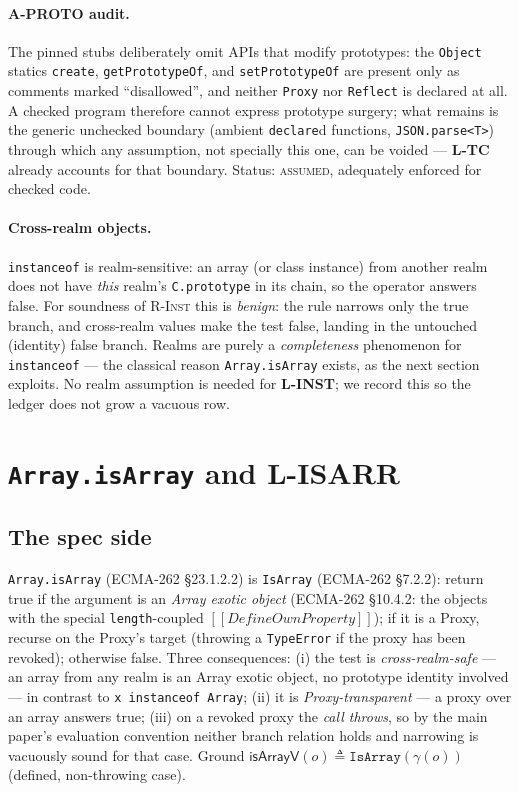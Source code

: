 \documentclass[11pt]{article}
\newcommand{\realize}{\gamma}
\newcommand{\ecma}[1]{ECMA-262 \S#1}
\newcommand{\intm}[1]{[[#1]]}
\begin{document}
\paragraph{\textbf{A-PROTO} audit.}
The pinned stubs deliberately omit APIs that modify prototypes: the
\texttt{Object} statics \texttt{create}, \texttt{getPrototypeOf}, and
\texttt{setPrototypeOf} are present only as comments marked
``disallowed'', and neither \texttt{Proxy} nor \texttt{Reflect} is
declared at all. A checked program therefore cannot express prototype
surgery; what remains is the generic unchecked boundary (ambient
\texttt{declare}d functions, \texttt{JSON.parse<T>}) through which any
assumption, not specially this one, can be voided — \textbf{L-TC} already
accounts for that boundary. Status: \textsc{assumed}, adequately
enforced for checked code.

\paragraph{Cross-realm objects.}
\texttt{instanceof} is realm-sensitive: an array (or class instance)
from another realm does not have \emph{this} realm's
\texttt{C.prototype} in its chain, so the operator answers
\textsf{false}. For soundness of \textsc{R-Inst} this is \emph{benign}:
the rule narrows only the true branch, and cross-realm values make the
test false, landing in the untouched (identity) false branch. Realms are
purely a \emph{completeness} phenomenon for \texttt{instanceof} — the
classical reason \texttt{Array.isArray} exists, as the next section
exploits. No realm assumption is needed for \textbf{L-INST}; we record
this so the ledger does not grow a vacuous row.

\section{\texttt{Array.isArray} and \textbf{L-ISARR}}
\label{sec:isarr}

\subsection{The spec side}

\texttt{Array.isArray} (\ecma{23.1.2.2}) is \texttt{IsArray}
(\ecma{7.2.2}): return \textsf{true} if the argument is an
\emph{Array exotic object} (\ecma{10.4.2}: the objects with the special
\texttt{length}-coupled $\intm{DefineOwnProperty}$); if it is a Proxy,
recurse on the Proxy's target (throwing a \texttt{TypeError} if the
proxy has been revoked); otherwise \textsf{false}. Three consequences:
(i) the test is \emph{cross-realm-safe} — an array from any realm is an
Array exotic object, no prototype identity involved — in contrast to
\texttt{x instanceof Array}; (ii) it is \emph{Proxy-transparent} — a
proxy over an array answers \textsf{true}; (iii) on a revoked proxy the
\emph{call throws}, so by the main paper's evaluation convention neither
branch relation holds and narrowing is vacuously sound for that case.
Ground $\mathsf{isArrayV}(o) \triangleq \texttt{IsArray}(\realize(o))$
(defined, non-throwing case).
\end{document}

